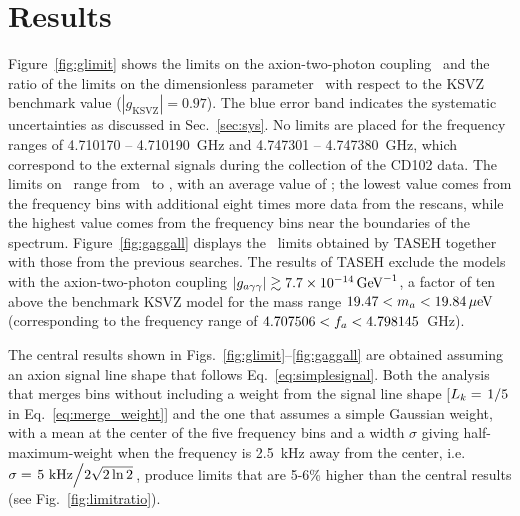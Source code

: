 \section{Results} \label{sec:results}

Figure~\ref{fig:glimit} shows the limits on the axion-two-photon coupling 
\gagg\ and the ratio of the limits on the dimensionless parameter \ggamma\ 
with respect to the KSVZ benchmark value ($\left|g_\text{KSVZ}\right|=0.97$).  
The blue error band indicates the systematic uncertainties as discussed in 
Sec.~\ref{sec:sys}. No limits are placed for the frequency ranges of 
4.710170 -- 4.710190~GHz and 4.747301 -- 4.747380~GHz, which correspond to 
the external signals during the collection of the CD102 data. 
The limits on \gagg\ range from \lolimit\ to \hilimit, with an average 
value of \avelimit; the lowest value comes from the frequency bins with 
additional eight times more data from the rescans, while the highest value 
comes from the frequency bins near the boundaries of the spectrum. 
Figure~\ref{fig:gaggall} displays the \gagg\ limits obtained by TASEH 
together with those from the previous searches. 
The results of TASEH exclude the models with the axion-two-photon
coupling $\left|g_{a\gamma\gamma}\right|\gtrsim 7.7\times 10^{-14}\,\text{Ge\hspace{-.08em}V}^{-1}$, a factor of ten above the benchmark
KSVZ model for the mass range $19.47 < m_a < 19.84 \,\mu\text{e\hspace{-.08em}V}$ (corresponding to 
the frequency range of $4.707506 < f_a < 4.798145$~GHz). 


The central results shown in Figs.~\ref{fig:glimit}--\ref{fig:gaggall} are 
obtained assuming an axion signal line shape that follows 
Eq.~\eqref{eq:simplesignal}. Both the analysis that merges bins without 
including a weight from the signal line shape [$L_{k}=\left.1\middle/5\right.$ 
in Eq.~\eqref{eq:merge_weight}] and the one 
that assumes a simple Gaussian weight, with a mean at the center of the five 
frequency bins and a width $\sigma$ 
giving half-maximum-weight when the frequency 
is 2.5~kHz away from the center, i.e. 
$\sigma=\left.5~\text{kHz}\middle/2\sqrt{2\ln2}\right.$, produce limits that 
are 5-6\% higher than the central results (see Fig.~\ref{fig:limitratio}). 

